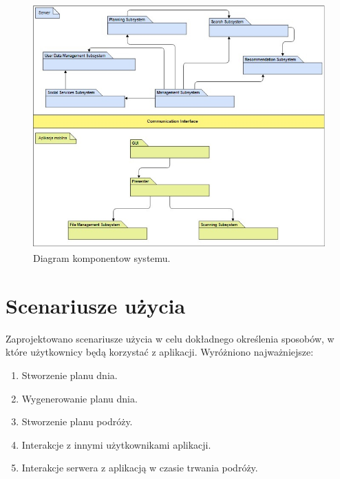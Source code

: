 \documentclass[10pt,twoside,a4paper]{report}
\begin{document}
\indent\newline
\begin{figure}[h]
\centering
\includegraphics[width=\linewidth]{subsystems}
\caption{Diagram komponentow systemu.}
\label{fig:subsystems}
\end{figure}

\section{Scenariusze użycia}
\par Zaprojektowano scenariusze użycia w celu dokładnego określenia sposobów, w które użytkownicy będą korzystać z aplikacji. Wyróżniono najważniejsze:
\begin{enumerate}
  \item Stworzenie planu dnia.
  \item Wygenerowanie planu dnia.
  \item Stworzenie planu podróży.
  \item Interakcje z innymi użytkownikami aplikacji.
  \item Interakcje serwera z aplikacją w czasie trwania podróży.
\end{enumerate}
\end{document}
